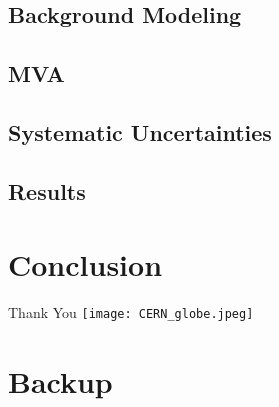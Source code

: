 \documentclass[aspectratio=169,xcolor=table]{beamer}
\begin{document}
  \subsection{Background Modeling}

  \subsection{MVA}

  \subsection{Systematic Uncertainties}

  \subsection{Results}

\section{Conclusion}

  \begin{frame}{Thank You}
    \centering
    \texttt{[image: CERN\_globe.jpeg]}
  \end{frame}

\appendix

\section{Backup }
\end{document}
